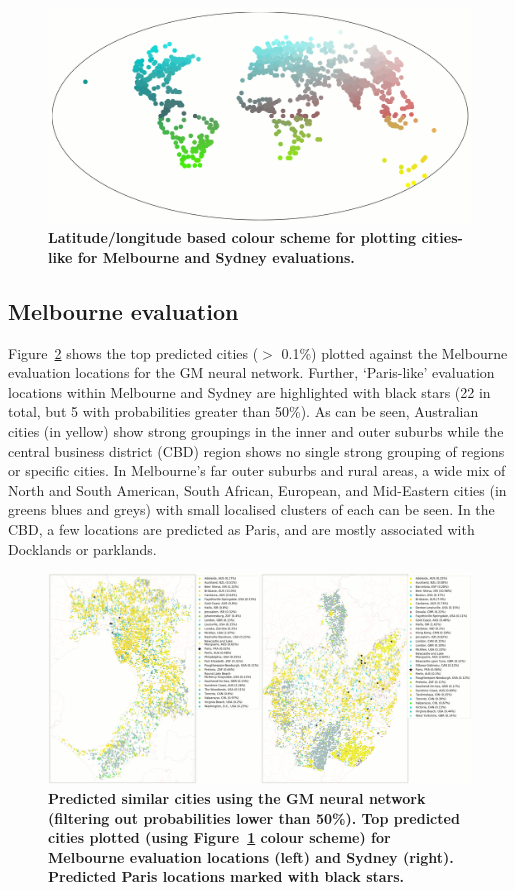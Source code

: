 \documentclass[urbansci,article,submit,moreauthors,pdftex]{Definitions/mdpi}
\begin{document}
\begin{figure}[!htbp]
\centering    
\includegraphics[scale=0.25]{Fig5.png} 
\caption{\bf Latitude/longitude based colour scheme for plotting cities-like for Melbourne and Sydney evaluations.}    
 \label{fig:colorscheme}  
\end{figure} 

\subsection{Melbourne evaluation} 

Figure~\ref{fig:melmaps} shows the top predicted cities ($>$ 0.1\%) plotted against the Melbourne evaluation locations for the GM neural network. Further, `Paris-like' evaluation locations within Melbourne and Sydney are highlighted with black stars (22 in total, but 5 with probabilities greater than 50\%). As can be seen, Australian cities (in yellow) show strong groupings in the inner and outer suburbs while the central business district (CBD) region shows no single strong grouping of regions or specific cities. In Melbourne's far outer suburbs and rural areas, a wide mix of North and South American, South African, European, and Mid-Eastern cities (in greens blues and greys) with small localised clusters of each can be seen. In the CBD, a few locations are predicted as Paris, and are mostly associated with Docklands or parklands.

\begin{figure}[!htbp]
\centering   
\includegraphics[scale=0.10]{Figure4GM.png}  
\caption{  \bf Predicted similar cities using the GM neural network (filtering out probabilities lower than 50\%). Top predicted cities plotted (using Figure~\ref{fig:colorscheme} colour scheme) for Melbourne evaluation locations (left) and Sydney (right). Predicted Paris locations marked with black stars.}    
 \label{fig:melmaps}  
\end{figure} 
\end{document}
